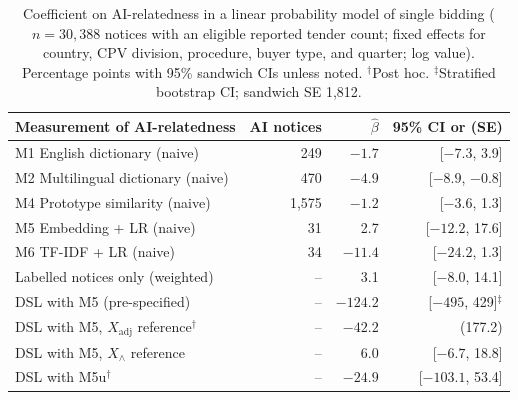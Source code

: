 \documentclass[runningheads]{llncs}
\begin{document}
\begin{table}[t]
\caption{Coefficient on AI-relatedness in a linear probability model of single bidding ($n=30{,}388$ notices with an eligible reported tender count; fixed effects for country, CPV division, procedure, buyer type, and quarter; log value). Percentage points with 95\% sandwich CIs unless noted. $^\dagger$Post hoc. $^\ddagger$Stratified bootstrap CI; sandwich SE 1,812.}\label{tab:reg}
\centering
\begin{tabular}{lrrr}
\toprule
Measurement of AI-relatedness & AI notices & $\hat\beta$ & 95\% CI or (SE) \\
\midrule
M1 English dictionary (naive) & 249 & $-1.7$ & [$-7.3$, 3.9] \\
M2 Multilingual dictionary (naive) & 470 & $-4.9$ & [$-8.9$, $-0.8$] \\
M4 Prototype similarity (naive) & 1,575 & $-1.2$ & [$-3.6$, 1.3] \\
M5 Embedding + LR (naive) & 31 & 2.7 & [$-12.2$, 17.6] \\
M6 TF-IDF + LR (naive) & 34 & $-11.4$ & [$-24.2$, 1.3] \\
Labelled notices only (weighted) & -- & 3.1 & [$-8.0$, 14.1] \\
DSL with M5 (pre-specified) & -- & $-124.2$ & [$-495$, 429]$^\ddagger$ \\
DSL with M5, $X_{\mathrm{adj}}$ reference$^\dagger$ & -- & $-42.2$ & (177.2) \\
DSL with M5, $X_\wedge$ reference & -- & 6.0 & [$-6.7$, 18.8] \\
DSL with M5u$^\dagger$ & -- & $-24.9$ & [$-103.1$, 53.4] \\
\bottomrule
\end{tabular}
\end{table}
\end{document}
